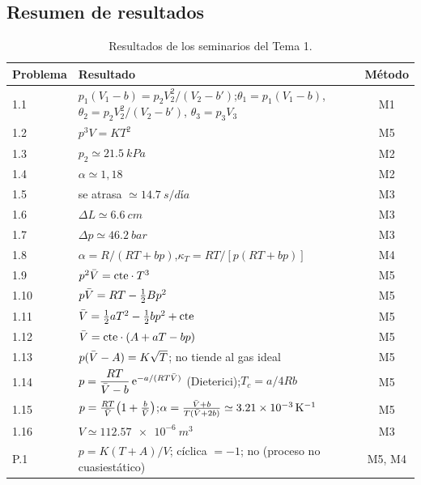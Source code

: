 \subsection{Resumen de resultados}
\begin{table}[H]
\centering
\caption{Resultados de los seminarios del Tema 1.}
\small
\renewcommand{\arraystretch}{1.3}
\begin{tabularx}{\textwidth}{lXc}
\toprule
Problema & Resultado & Método\\
\midrule
1.1 & $p_1(V_1-b)=p_2V_2^2/(V_2-b')$;\enspace $\theta_1=p_1(V_1-b)$, $\theta_2=p_2V_2^2/(V_2-b')$, $\theta_3=p_3V_3$ & M1\\
1.2 & $p^3V=KT^2$ & M5\\
1.3 & $p_2\simeq\SI{21,5}{kPa}$ & M2\\
1.4 & $\alpha\simeq1{,}18$ & M2\\
1.5 & se atrasa $\simeq\SI{14,7}{s/día}$ & M3\\
1.6 & $\Delta L\simeq\SI{6,6}{cm}$ & M3\\
1.7 & $\Delta p\simeq\SI{46,2}{bar}$ & M3\\
1.8 & $\alpha=R/(RT+bp)$,\enspace $\kappa_T=RT/[p(RT+bp)]$ & M4\\
1.9 & $p^2\bar{V}=\mathrm{cte}\cdot T^3$ & M5\\
1.10 & $p\bar{V}=RT-\tfrac12Bp^2$ & M5\\
1.11 & $\bar{V}=\tfrac12aT^2-\tfrac12bp^2+\mathrm{cte}$ & M5\\
1.12 & $\bar{V}=\mathrm{cte}\cdot(A+aT-bp)$ & M5\\
1.13 & $p(\bar{V}-A)=K\sqrt T$; no tiende al gas ideal & M5\\
1.14 & $p=\dfrac{RT}{\bar{V}-b}\,\mathrm{e}^{-a/(RT\bar{V})}$ (Dieterici);\enspace $T_c=a/4Rb$ & M5\\
1.15 & $p=\frac{RT}{\bar{V}}\bigl(1+\frac b{\bar{V}}\bigr)$;\enspace $\alpha=\frac{\bar{V}+b}{T(\bar{V}+2b)}\simeq\SI{3,21e-3}{K^{-1}}$ & M5\\
1.16 & $V\simeq\SI{112,57e-6}{m^3}$ & M3\\
P.1 & $p=K(T+A)/V$; cíclica $=-1$; no (proceso no cuasiestático) & M5, M4\\
\bottomrule
\end{tabularx}
\end{table}

